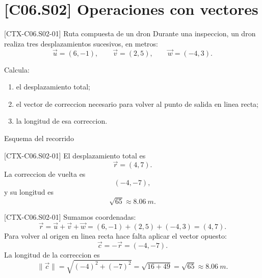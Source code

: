 \section{[C06.S02] Operaciones con vectores}

\begin{exercise}{[CTX-C06.S02-01] Ruta compuesta de un dron}
Durante una inspeccion, un dron realiza tres desplazamientos sucesivos, en metros:
\[
\vec u=(6,-1),\qquad \vec v=(2,5),\qquad \vec w=(-4,3).
\]

Calcula:
\begin{enumerate}
  \item el desplazamiento total;
  \item el vector de correccion necesario para volver al punto de salida en linea recta;
  \item la longitud de esa correccion.
\end{enumerate}
\end{exercise}

\begin{databox}{Esquema del recorrido}
\begin{center}
\end{center}
\end{databox}

\begin{shortanswer}{[CTX-C06.S02-01]}
El desplazamiento total es
\[
\vec r=(4,7).
\]
La correccion de vuelta es
\[
(-4,-7),
\]
y su longitud es
\[
\sqrt{65}\approx \SI{8.06}{m}.
\]
\end{shortanswer}

\begin{fullsolution}{[CTX-C06.S02-01]}
Sumamos coordenadas:
\[
\vec r=\vec u+\vec v+\vec w=(6,-1)+(2,5)+(-4,3)=(4,7).
\]
Para volver al origen en linea recta hace falta aplicar el vector opuesto:
\[
\vec c=-\vec r=(-4,-7).
\]
La longitud de la correccion es
\[
\|\vec c\|=\sqrt{(-4)^2+(-7)^2}=\sqrt{16+49}=\sqrt{65}\approx \SI{8.06}{m}.
\]
\end{fullsolution}

